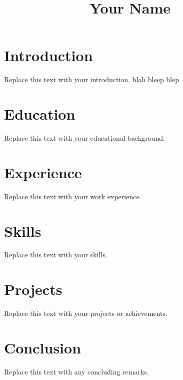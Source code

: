 \documentclass{article}
\begin{document}
\title{Your Name}
\author{}
\date{}

\maketitle

\section{Introduction}
Replace this text with your introduction. blah bleep blep

\section{Education}
Replace this text with your educational background.

\section{Experience}
Replace this text with your work experience.

\section{Skills}
Replace this text with your skills.

\section{Projects}
Replace this text with your projects or achievements.

\section{Conclusion}
Replace this text with any concluding remarks.
\end{document}

